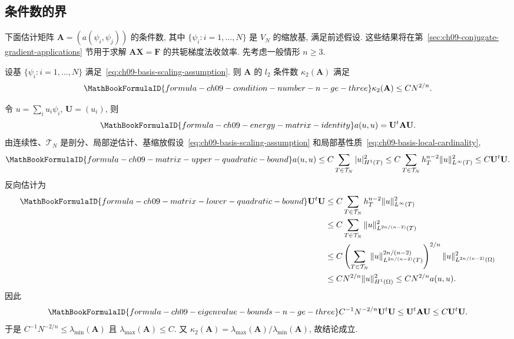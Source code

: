 \subsection{条件数的界}
\label{sec:ch09-condition-number-bounds}
\setcounter{thmcount}{0}
\setcounter{equation}{0}

下面估计矩阵 $\mathbf A=(a(\psi_i,\psi_j))$ 的条件数, 其中 $\{\psi_i:i=1,\ldots,N\}$ 是 $V_N$ 的缩放基, 满足前述假设. 这些结果将在第~\ref{sec:ch09-conjugate-gradient-applications} 节用于求解 $\mathbf A\mathbf X=\mathbf F$ 的共轭梯度法收敛率. 先考虑一般情形 $n\geq3$.

\begin{Theorem}
\label{thm:ch09-condition-number-n-ge-three}
设基 $\{\psi_i:i=1,\ldots,N\}$ 满足~\eqref{eq:ch09-basis-scaling-assumption}. 则 $\mathbf A$ 的 $l_2$ 条件数 $\kappa_2(\mathbf A)$ 满足
\[
\MathBookFormulaID{formula-ch09-condition-number-n-ge-three}
\kappa_2(\mathbf A)\leq CN^{2/n}.
\]
\end{Theorem}

\begin{Proof}
令 $u=\sum_i u_i\psi_i$, $\mathbf U=(u_i)$, 则
\begin{equation}
\MathBookFormulaID{formula-ch09-energy-matrix-identity}
\label{eq:ch09-energy-matrix-identity}
a(u,u)=\mathbf U^t\mathbf A\mathbf U.
\end{equation}
由连续性、$\mathcal T_N$ 是剖分、局部逆估计、基缩放假设~\eqref{eq:ch09-basis-scaling-assumption} 和局部基性质~\eqref{eq:ch09-basis-local-cardinality},
\[
\MathBookFormulaID{formula-ch09-matrix-upper-quadratic-bound}
a(u,u)
\leq C\sum_{T\in\mathcal T_N}|u|_{H^1(T)}^2
\leq C\sum_{T\in\mathcal T_N}h_T^{n-2}\|u\|_{L^\infty(T)}^2
\leq C\mathbf U^t\mathbf U.
\]
反向估计为
\begin{align*}
\MathBookFormulaID{formula-ch09-matrix-lower-quadratic-bound}
\mathbf U^t\mathbf U
&\leq C\sum_{T\in\mathcal T_N}h_T^{n-2}\|u\|_{L^\infty(T)}^2\\
&\leq C\sum_{T\in\mathcal T_N}\|u\|_{L^{2n/(n-2)}(T)}^2\\
&\leq C\left(\sum_{T\in\mathcal T_N}
\|u\|_{L^{2n/(n-2)}(T)}^{2n/(n-2)}\right)^{2/n}
\|u\|_{L^{2n/(n-2)}(\Omega)}^2\\
&\leq CN^{2/n}\|u\|_{H^1(\Omega)}^2
\leq CN^{2/n}a(u,u).
\end{align*}
因此
\[
\MathBookFormulaID{formula-ch09-eigenvalue-bounds-n-ge-three}
C^{-1}N^{-2/n}\mathbf U^t\mathbf U
\leq\mathbf U^t\mathbf A\mathbf U
\leq C\mathbf U^t\mathbf U.
\]
于是 $C^{-1}N^{-2/n}\leq\lambda_{\min}(\mathbf A)$ 且 $\lambda_{\max}(\mathbf A)\leq C$. 又 $\kappa_2(\mathbf A)=\lambda_{\max}(\mathbf A)/\lambda_{\min}(\mathbf A)$, 故结论成立.
\end{Proof}

